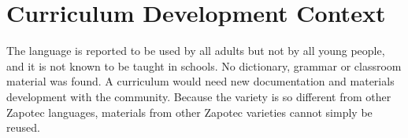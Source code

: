 \documentclass[12pt]{article}
\begin{document}
\section{Curriculum Development Context}
The language is reported to be used by all adults but not by all young people, and it is not known to be taught in schools. No dictionary, grammar or classroom material was found. A curriculum would need new documentation and materials development with the community. Because the variety is so different from other Zapotec languages, materials from other Zapotec varieties cannot simply be reused.
\end{document}
